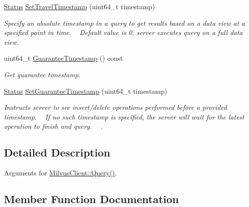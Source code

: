 \begin{DoxyCompactItemize}
\mbox{\label{classmilvus_1_1_query_arguments_a114498bb746857299e37e2e6e3867536}} 
\hyperlink{classmilvus_1_1_status}{Status} \hyperlink{classmilvus_1_1_query_arguments_a114498bb746857299e37e2e6e3867536}{Set\+Travel\+Timestamp} (uint64\+\_\+t timestamp)
\begin{DoxyCompactList}\small\item\em Specify an absolute timestamp in a query to get results based on a data view at a specified point in time. ~\newline
 Default value is 0, server executes query on a full data view. \end{DoxyCompactList}\item 
\mbox{\label{classmilvus_1_1_query_arguments_a12d32edef32435204f9be016296f4246}} 
uint64\+\_\+t \hyperlink{classmilvus_1_1_query_arguments_a12d32edef32435204f9be016296f4246}{Guarantee\+Timestamp} () const
\begin{DoxyCompactList}\small\item\em Get guarantee timestamp. \end{DoxyCompactList}\item 
\hyperlink{classmilvus_1_1_status}{Status} \hyperlink{classmilvus_1_1_query_arguments_a027873a6b8008516c638838698dbb81d}{Set\+Guarantee\+Timestamp} (uint64\+\_\+t timestamp)
\begin{DoxyCompactList}\small\item\em Instructs server to see insert/delete operations performed before a provided timestamp. ~\newline
If no such timestamp is specified, the server will wait for the latest operation to finish and query. ~\newline
. \end{DoxyCompactList}\end{DoxyCompactItemize}


\subsection{Detailed Description}
Arguments for \hyperlink{classmilvus_1_1_milvus_client_a2c27e3b681313329ccf491867d717182}{Milvus\+Client\+::\+Query()}. 

\subsection{Member Function Documentation}
\mbox{\label{classmilvus_1_1_query_arguments_a027873a6b8008516c638838698dbb81d}} 
